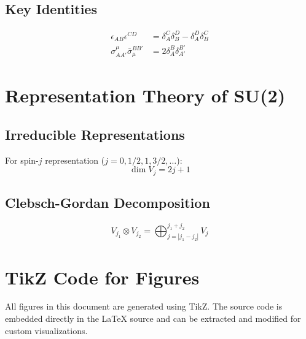 \documentclass[12pt,a4paper]{article}
\theoremstyle{definition}
\begin{document}
\subsection{Key Identities}
\begin{align}
\epsilon_{AB}\epsilon^{CD} &= \delta_A^C \delta_B^D - \delta_A^D \delta_B^C \\
\sigma^\mu_{AA'} \bar{\sigma}_\mu^{BB'} &= 2\delta_A^B \delta_{A'}^{B'}
\end{align}

\section{Representation Theory of SU(2)}

\subsection{Irreducible Representations}
For spin-$j$ representation ($j = 0, 1/2, 1, 3/2, \ldots$):
\begin{equation}
\dim V_j = 2j + 1
\end{equation}

\subsection{Clebsch-Gordan Decomposition}
\begin{equation}
V_{j_1} \otimes V_{j_2} = \bigoplus_{j=|j_1-j_2|}^{j_1+j_2} V_j
\end{equation}

\section{TikZ Code for Figures}

All figures in this document are generated using TikZ. The source code is embedded directly in the LaTeX source and can be extracted and modified for custom visualizations.

\end{document}
